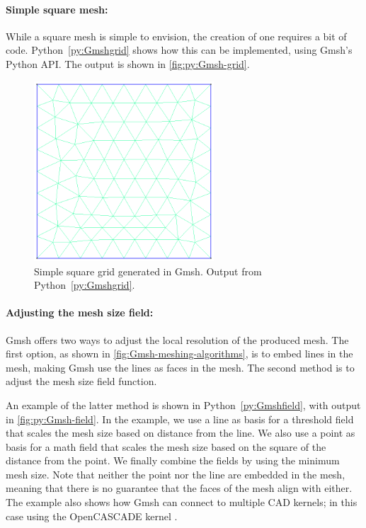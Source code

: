 \paragraph{Simple square mesh:}
While a square mesh is simple to envision, the creation of one requires a bit of code. Python~\ref{py:Gmshgrid} shows how this can be implemented, using Gmsh's Python API. The output is shown in \autoref{fig:py:Gmsh-grid}.


\begin{figure}[tp]
    \centering
    \includegraphics[width=0.6\textwidth]{report/Images/Software/Gmsh examples/gmsh_square_mesh.png}
    \caption[Simple square grid generated in Gmsh]{Simple square grid generated in Gmsh. Output from Python~\ref{py:Gmshgrid}.}
    \label{fig:py:Gmsh-grid}
\end{figure}


\paragraph{Adjusting the mesh size field:}
Gmsh offers two ways to adjust the local resolution of the produced mesh. The first option, as shown in \autoref{fig:Gmsh-meshing-algorithms}, is to embed lines in the mesh, making Gmsh use the lines as faces in the mesh. The second method is to adjust the mesh size field function.

An example of the latter method is shown in Python~\ref{py:Gmshfield}, with output in \autoref{fig:py:Gmsh-field}. In the example, we use a line as basis for a threshold field that scales the mesh size based on distance from the line. We also use a point as basis for a math field that scales the mesh size based on the square of the distance from the point. We finally combine the fields by using the minimum mesh size. Note that neither the point nor the line are embedded in the mesh, meaning that there is no guarantee that the faces of the mesh align with either. The example also shows how Gmsh can connect to multiple CAD kernels; in this case using the OpenCASCADE kernel \cite{Gmsh_reference}.

